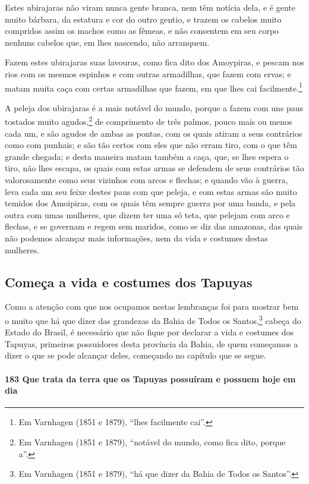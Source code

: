 Estes ubirajaras não viram nunca gente branca, nem têm notícia dela, e é gente muito
bárbara, da estatura e cor do outro gentio, e trazem os cabelos muito compridos assim os
machos como as fêmeas, e não consentem em seu corpo nenhuns cabelos que, em lhes nascendo,
não arranquem.

Fazem estes ubirajaras suas lavouras, como fica dito dos Amoypiras, e pescam nos rios com
os mesmos espinhos e com outras armadilhas, que fazem com ervas; e matam muita caça com
certas armadilhas que fazem, em que lhes cai facilmente.\footnote{ Em Varnhagen (1851 e
1879), ``lhes facilmente cai''.}

A peleja dos ubirajaras é a mais notável do mundo, porque a fazem com uns paus tostados
muito agudos,\footnote{ Em Varnhagen (1851 e 1879), ``notável do mundo, como fica dito,
porque a''.} de comprimento de três palmos, pouco mais ou menos cada um, e são agudos de
ambas as pontas, com os quais atiram a seus contrários como com punhais; e são tão certos
com eles que não erram tiro, com o que têm grande chegada; e desta maneira matam também a
caça, que, se lhes espera o tiro, não lhes escapa, os quais com estas armas se defendem de
seus contrários tão valorosamente como seus vizinhos com arcos e flechas; e quando vão à
guerra, leva cada um seu feixe destes paus com que peleja, e com estas armas são muito
temidos dos Amoipiras, com os quais têm sempre guerra por uma banda, e pela outra com umas
mulheres, que dizem ter uma só teta, que pelejam com arco e flechas, e se governam e regem
sem maridos, como se diz das amazonas, das quais não podemos alcançar mais informações,
nem da vida e costumes destas mulheres.

\subsection{Começa a vida e costumes dos Tapuyas}

Como a atenção com que nos ocupamos nestas lembranças foi para mostrar bem o muito que há
que dizer das grandezas da Bahia de Todos os Santos,\footnote{ Em Varnhagen (1851 e 1879),
``há que dizer da Bahia de Todos os Santos''.} cabeça do Estado do Brasil, é necessário
que não fique por declarar a vida e costumes dos Tapuyas, primeiros possuidores desta
província da Bahia, de quem começamos a dizer o que se pode alcançar deles, começando no
capítulo que se segue.

\paragraph{183 Que trata da terra que os Tapuyas possuíram e possuem hoje em dia}

